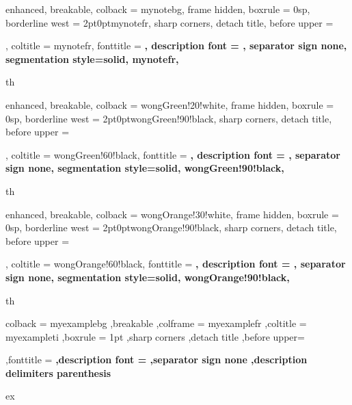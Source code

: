 

{%
	enhanced,
	breakable,
	colback = mynotebg,
	frame hidden,
	boxrule = 0sp,
	borderline west = {2pt}{0pt}{mynotefr},
	sharp corners,
	detach title,
	before upper = \tcbtitle\par\smallskip,
	coltitle = mynotefr,
	fonttitle = \bfseries\sffamily,
	description font = \mdseries,
	separator sign none,
	segmentation style={solid, mynotefr},
}
{th}


{%
	enhanced,
	breakable,
	colback = wongGreen!20!white,
	frame hidden,
	boxrule = 0sp,
	borderline west = {2pt}{0pt}{wongGreen!90!black},
	sharp corners,
	detach title,
	before upper = \tcbtitle\par\smallskip,
	coltitle = wongGreen!60!black,
	fonttitle = \bfseries\sffamily,
	description font = \mdseries,
	separator sign none,
	segmentation style={solid, wongGreen!90!black},
}
{th}


{%
	enhanced,
	breakable,
	colback = wongOrange!30!white,
	frame hidden,
	boxrule = 0sp,
	borderline west = {2pt}{0pt}{wongOrange!90!black},
	sharp corners,
	detach title,
	before upper = \tcbtitle\par\smallskip,
	coltitle = wongOrange!60!black,
	fonttitle = \bfseries\sffamily,
	description font = \mdseries,
	separator sign none,
	segmentation style={solid, wongOrange!90!black},
}
{th}


{%
	colback = myexamplebg
	,breakable
	,colframe = myexamplefr
	,coltitle = myexampleti
	,boxrule = 1pt
	,sharp corners
	,detach title
	,before upper=\tcbtitle\par\smallskip
	,fonttitle = \bfseries
	,description font = \mdseries
	,separator sign none
	,description delimiters parenthesis
}
{ex}


